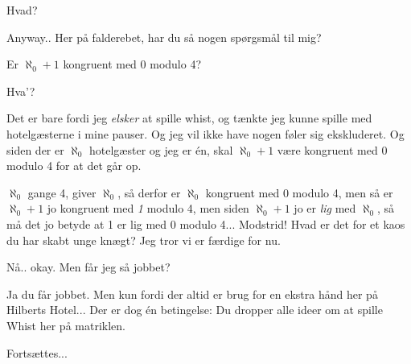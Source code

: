 \documentclass[a4paper,11pt]{article}
\begin{document}
\begin{sketch}
 Hvad?

 Anyway.. Her på falderebet, har du så nogen spørgsmål til mig?

 Er $\aleph_0+1$ kongruent med 0 modulo 4?

 Hva'? 

 Det er bare fordi jeg \textit{elsker} at spille whist, og tænkte jeg kunne spille med hotelgæsterne i mine pauser. Og jeg vil ikke have nogen føler sig ekskluderet. Og siden der er $\aleph_0$ hotelgæster og jeg er én, skal $\aleph_0+1$ være kongruent med 0 modulo 4 for at det går op.

  $\aleph_0$ gange 4, giver $\aleph_0$, så derfor er $\aleph_0$ kongruent med 0 modulo 4, men så er $\aleph_0+1$ jo kongruent med \textit{1} modulo 4, men siden $\aleph_0+1$ jo er \textit{lig} med $\aleph_0$, så må det jo betyde at 1 er lig med 0 modulo 4... Modstrid!  Hvad er det for et kaos du har skabt unge knægt? Jeg tror vi er færdige for nu.

 Nå.. okay. Men får jeg så jobbet?

  Ja du får jobbet. Men kun fordi der altid er brug for en ekstra hånd her på Hilberts Hotel... Der er dog én betingelse: Du dropper alle ideer om at spille Whist her på matriklen.


 Fortsættes...

\end{sketch}

\end{document}
